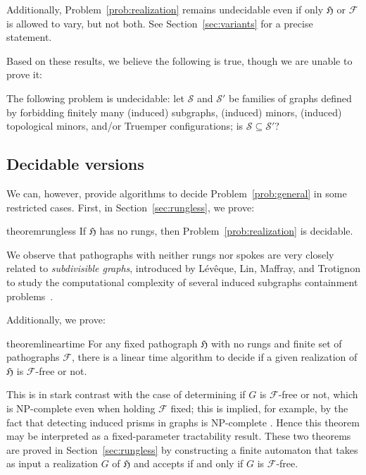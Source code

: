 \documentclass{article}
\newcommand{\Fc}{\mathcal{F}}
\newcommand{\Hf}{\mathfrak{H}}
\newcommand{\Sc}{\mathcal{S}}
\begin{document}
Additionally, Problem~\ref{prob:realization} remains undecidable even if only $\Hf$ or $\Fc$ is allowed to vary, but not both. See Section~\ref{sec:variants} for a precise statement.

Based on these results, we believe the following is true, though we are unable to prove it:

\begin{conjecture}
The following problem is undecidable: let $\Sc$ and $\Sc'$ be families of graphs defined by forbidding finitely many (induced) subgraphs, (induced) minors, (induced) topological minors, and/or Truemper configurations; is $\Sc\subseteq \Sc'$?
\end{conjecture}

\subsection{Decidable versions}

We can, however, provide algorithms to decide Problem~\ref{prob:general} in some restricted cases. First, in Section~\ref{sec:rungless}, we prove:

\begin{restatable}{theorem}{rungless}\label{thm:rungless}
If $\Hf$ has no rungs, then Problem~\ref{prob:realization} is decidable.
\end{restatable}
We observe that pathographs with neither rungs nor spokes are very closely related to \textit{subdivisible graphs}, introduced by L\'ev\^eque, Lin, Maffray, and Trotignon to study the computational complexity of several induced subgraphs containment problems~\cite{llmt}.

Additionally, we prove:
\begin{restatable}{theorem}{lineartime}\label{thm:lineartime}
For any fixed pathograph $\Hf$ with no rungs and finite set of pathographs $\Fc$, there is a linear time algorithm to decide if a given realization of $\Hf$ is $\Fc$-free or not.
\end{restatable}

This is in stark contrast with the case of determining if $G$ is $\Fc$-free or not, which is NP-complete even when holding $\Fc$ fixed; this is implied, for example, by the fact that detecting induced prisms in graphs is NP-complete \cite{prismnpc}. Hence this theorem may be interpreted as a fixed-parameter tractability result. These two theorems are proved in Section~\ref{sec:rungless} by constructing a finite automaton that takes as input a realization $G$ of $\Hf$ and accepts if and only if $G$ is $\Fc$-free.
\end{document}
